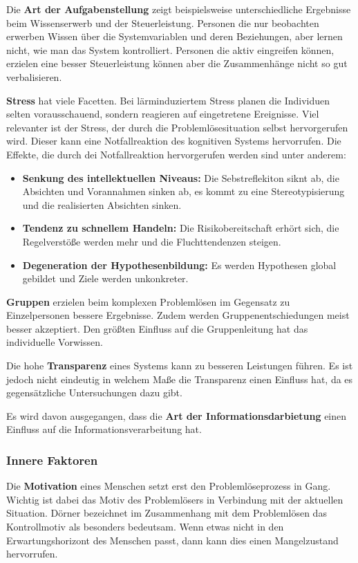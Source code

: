 Die \textbf{Art der Aufgabenstellung} zeigt beispielsweise unterschiedliche Ergebnisse beim Wissenserwerb und der Steuerleistung. Personen die nur beobachten erwerben Wissen über die Systemvariablen und deren Beziehungen, aber lernen nicht, wie man das System kontrolliert. Personen die aktiv eingreifen können, erzielen eine besser Steuerleistung können aber die Zusammenhänge nicht so gut verbalisieren.

\textbf{Stress} hat viele Facetten. Bei lärminduziertem Stress planen die Individuen selten vorausschauend, sondern reagieren auf eingetretene Ereignisse. Viel relevanter ist der Stress, der durch die Problemlösesituation selbst hervorgerufen wird. Dieser kann eine Notfallreaktion des kognitiven Systems hervorrufen. Die Effekte, die durch dei Notfallreaktion hervorgerufen werden sind unter anderem:
\begin{itemize}
\item \textbf{Senkung des intellektuellen Niveaus:} Die Sebstreflekiton siknt ab, die Absichten und Vorannahmen sinken ab, es kommt zu eine Stereotypisierung und die realisierten Absichten sinken.
\item \textbf{Tendenz zu schnellem Handeln:} Die Risikobereitschaft erhört sich, die Regelverstöße werden mehr und die Fluchttendenzen steigen.
\item \textbf{Degeneration der Hypothesenbildung:} Es werden Hypothesen global gebildet und Ziele werden unkonkreter.
\end{itemize}

\textbf{Gruppen} erzielen beim komplexen Problemlösen im Gegensatz zu Einzelpersonen bessere Ergebnisse. Zudem werden Gruppenentschiedungen meist besser akzeptiert. Den größten Einfluss auf die Gruppenleitung hat das individuelle Vorwissen.

Die hohe \textbf{Transparenz} eines Systems kann zu besseren Leistungen führen. Es ist jedoch nicht eindeutig in welchem Maße die Transparenz einen Einfluss hat, da es gegensätzliche Untersuchungen dazu gibt. 

Es wird davon ausgegangen, dass die \textbf{Art der Informationsdarbietung} einen Einfluss auf die Informationsverarbeitung hat.

\subsubsection*{Innere Faktoren}
Die \textbf{Motivation} eines Menschen setzt erst den Problemlöseprozess in Gang. \cite{Dorner1984} Wichtig ist dabei das Motiv des Problemlösers in Verbindung mit der aktuellen Situation. Dörner bezeichnet im Zusammenhang mit dem Problemlösen das Kontrollmotiv als besonders bedeutsam. Wenn etwas nicht in den Erwartungshorizont des Menschen passt, dann kann dies einen Mangelzustand hervorrufen. 

